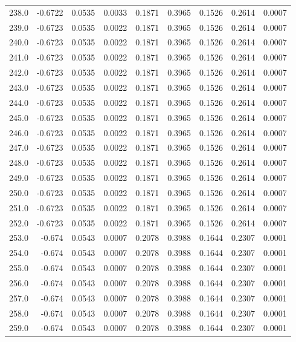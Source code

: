 \begin{longtable}{lrrrrrrrr}
238.0 & -0.6722 & 0.0535 & 0.0033 & 0.1871 & 0.3965 & 0.1526 & 0.2614 & 0.0007 \\
239.0 & -0.6723 & 0.0535 & 0.0022 & 0.1871 & 0.3965 & 0.1526 & 0.2614 & 0.0007 \\
240.0 & -0.6723 & 0.0535 & 0.0022 & 0.1871 & 0.3965 & 0.1526 & 0.2614 & 0.0007 \\
241.0 & -0.6723 & 0.0535 & 0.0022 & 0.1871 & 0.3965 & 0.1526 & 0.2614 & 0.0007 \\
242.0 & -0.6723 & 0.0535 & 0.0022 & 0.1871 & 0.3965 & 0.1526 & 0.2614 & 0.0007 \\
243.0 & -0.6723 & 0.0535 & 0.0022 & 0.1871 & 0.3965 & 0.1526 & 0.2614 & 0.0007 \\
244.0 & -0.6723 & 0.0535 & 0.0022 & 0.1871 & 0.3965 & 0.1526 & 0.2614 & 0.0007 \\
245.0 & -0.6723 & 0.0535 & 0.0022 & 0.1871 & 0.3965 & 0.1526 & 0.2614 & 0.0007 \\
246.0 & -0.6723 & 0.0535 & 0.0022 & 0.1871 & 0.3965 & 0.1526 & 0.2614 & 0.0007 \\
247.0 & -0.6723 & 0.0535 & 0.0022 & 0.1871 & 0.3965 & 0.1526 & 0.2614 & 0.0007 \\
248.0 & -0.6723 & 0.0535 & 0.0022 & 0.1871 & 0.3965 & 0.1526 & 0.2614 & 0.0007 \\
249.0 & -0.6723 & 0.0535 & 0.0022 & 0.1871 & 0.3965 & 0.1526 & 0.2614 & 0.0007 \\
250.0 & -0.6723 & 0.0535 & 0.0022 & 0.1871 & 0.3965 & 0.1526 & 0.2614 & 0.0007 \\
251.0 & -0.6723 & 0.0535 & 0.0022 & 0.1871 & 0.3965 & 0.1526 & 0.2614 & 0.0007 \\
252.0 & -0.6723 & 0.0535 & 0.0022 & 0.1871 & 0.3965 & 0.1526 & 0.2614 & 0.0007 \\
253.0 & -0.674 & 0.0543 & 0.0007 & 0.2078 & 0.3988 & 0.1644 & 0.2307 & 0.0001 \\
254.0 & -0.674 & 0.0543 & 0.0007 & 0.2078 & 0.3988 & 0.1644 & 0.2307 & 0.0001 \\
255.0 & -0.674 & 0.0543 & 0.0007 & 0.2078 & 0.3988 & 0.1644 & 0.2307 & 0.0001 \\
256.0 & -0.674 & 0.0543 & 0.0007 & 0.2078 & 0.3988 & 0.1644 & 0.2307 & 0.0001 \\
257.0 & -0.674 & 0.0543 & 0.0007 & 0.2078 & 0.3988 & 0.1644 & 0.2307 & 0.0001 \\
258.0 & -0.674 & 0.0543 & 0.0007 & 0.2078 & 0.3988 & 0.1644 & 0.2307 & 0.0001 \\
259.0 & -0.674 & 0.0543 & 0.0007 & 0.2078 & 0.3988 & 0.1644 & 0.2307 & 0.0001 \\

\end{longtable}
